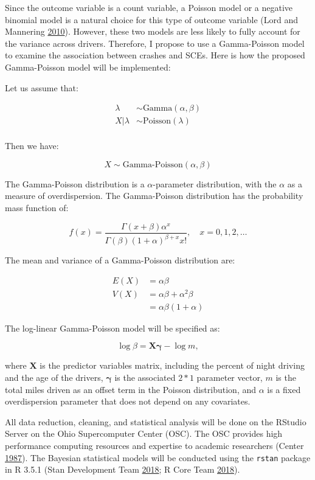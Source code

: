 \documentclass[12pt]{book}
\numberwithin{equation}{chapter}
\begin{document}
Since the outcome variable is a count variable, a Poisson model or a negative binomial model is a natural choice for this type of outcome variable (Lord and Mannering \protect\hyperlink{ref-lord2010statistical}{2010}). However, these two models are less likely to fully account for the variance across drivers. Therefore, I propose to use a Gamma-Poisson model to examine the association between crashes and SCEs. Here is how the proposed Gamma-Poisson model will be implemented:

Let us assume that:

\[
\begin{aligned}
\lambda & \sim \text{Gamma}(\alpha, \beta)\\
X|\lambda & \sim \text{Poisson}(\lambda)\\
\end{aligned}
\]

Then we have:

\[X \sim \text{Gamma-Poisson}(\alpha, \beta)\]

The Gamma-Poisson distribution is a \(\alpha\)-parameter distribution, with the \(\alpha\) as a measure of overdispersion. The Gamma-Poisson distribution has the probability mass function of:

\[f(x) = \frac{\Gamma(x + \beta)\alpha^x}{\Gamma(\beta)(1 + \alpha)^{\beta + x}x!}, \quad x = 0, 1, 2, \dots\]

The mean and variance of a Gamma-Poisson distribution are:

\[
\begin{aligned}
E(X) & = \alpha\beta \\
V(X) & = \alpha\beta + \alpha^2\beta\\
     & = \alpha\beta(1 + \alpha)
\end{aligned}
\]

The log-linear Gamma-Poisson model will be specified as:

\[
\log\beta = \mathbf{X\gamma} - \log m,
\]

where \(\mathbf{X}\) is the predictor variables matrix, including the percent of night driving and the age of the drivers, \(\mathbf{\gamma}\) is the associated \(2*1\) parameter vector, \(m\) is the total miles driven as an offset term in the Poisson distribution, and \(\alpha\) is a fixed overdispersion parameter that does not depend on any covariates.

All data reduction, cleaning, and statistical analysis will be done on the RStudio Server on the Ohio Supercomputer Center (OSC). The OSC provides high performance computing resources and expertise to academic researchers (Center \protect\hyperlink{ref-OSC1987}{1987}). The Bayesian statistical models will be conducted using the \texttt{rstan} package in R 3.5.1 (Stan Development Team \protect\hyperlink{ref-rstancitation}{2018}; R Core Team \protect\hyperlink{ref-Rcitation}{2018}).
\end{document}
